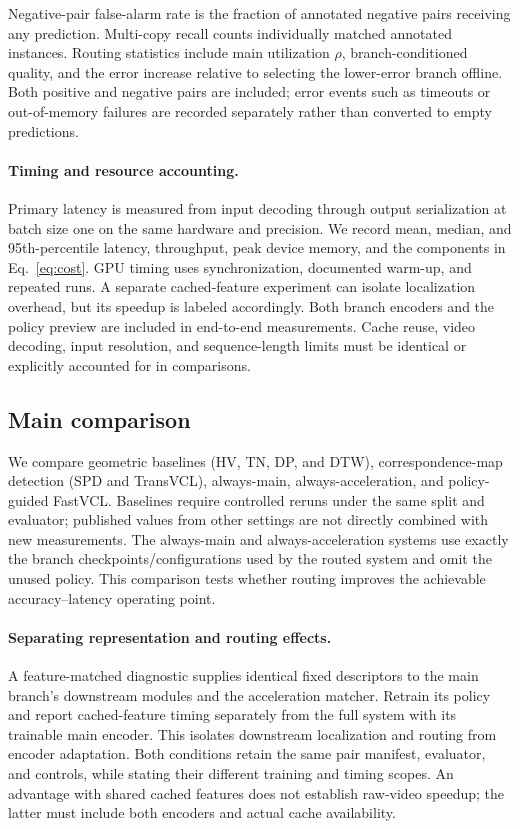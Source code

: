 Negative-pair false-alarm rate is the fraction of annotated negative pairs receiving any
prediction. Multi-copy recall counts individually matched annotated instances. Routing
statistics include main utilization $\rho$, branch-conditioned quality, and the error increase
relative to selecting the lower-error branch offline. Both positive and negative pairs are
included; error events such as timeouts or out-of-memory failures are recorded separately
rather than converted to empty predictions.

\paragraph{Timing and resource accounting.}
Primary latency is measured from input decoding through output serialization at batch size
one on the same hardware and precision. We record mean, median, and 95th-percentile latency,
throughput, peak device memory, and the components in Eq.~\ref{eq:cost}. GPU timing uses
synchronization, documented warm-up, and repeated runs. A separate cached-feature experiment
can isolate localization overhead, but its speedup is labeled accordingly. Both branch
encoders and the policy preview are included in end-to-end measurements. Cache reuse,
video decoding, input resolution, and sequence-length limits must be identical or explicitly
accounted for in comparisons.

\subsection{Main comparison}
We compare geometric baselines (HV, TN, DP, and DTW), correspondence-map detection (SPD and
TransVCL), always-main, always-acceleration, and policy-guided FastVCL. Baselines require
controlled reruns under the same split and evaluator; published values from other settings
are not directly combined with new measurements. The always-main and always-acceleration
systems use exactly the branch checkpoints/configurations used by the routed system and
omit the unused policy. This comparison tests whether routing improves the achievable
accuracy--latency operating point.

\paragraph{Separating representation and routing effects.}
A feature-matched diagnostic supplies identical fixed descriptors to the main branch's
downstream modules and the acceleration matcher. Retrain its policy and report cached-feature
timing separately from the full system with its trainable main encoder. This isolates
downstream localization and routing from encoder adaptation. Both conditions retain the
same pair manifest, evaluator, and controls, while stating their different training and
timing scopes. An advantage with shared cached features does not establish raw-video speedup;
the latter must include both encoders and actual cache availability.

